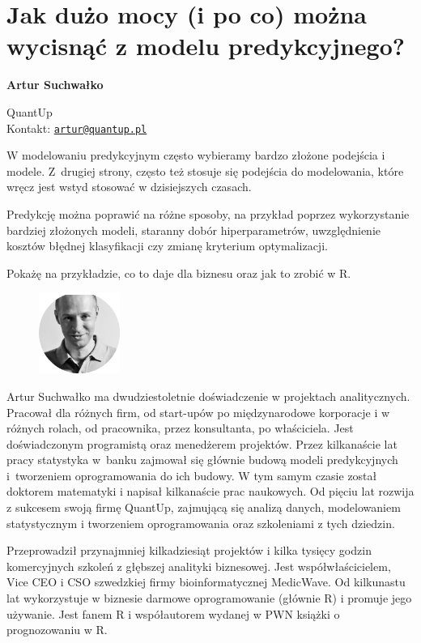 \documentclass[\main/boa.tex]{subfiles}
\begin{document}
\section{Jak dużo mocy (i po co) można wycisnąć z modelu predykcyjnego?}


\begin{minipage}{0.915\textwidth}
	\centering
  {\bf \LARGE {} Artur Suchwałko}
\end{minipage}


\begin{affiliations}
\begin{minipage}{0.915\textwidth}
\centering
\large QuantUp \\[1pt]
Kontakt: \href{mailto:artur@quantup.pl}{\nolinkurl{artur@quantup.pl}}\\
\end{minipage}
\end{affiliations}


W modelowaniu predykcyjnym często wybieramy bardzo złożone podejścia i modele. Z~drugiej strony, często też stosuje się podejścia do modelowania, które wręcz jest wstyd stosować w dzisiejszych czasach.

Predykcję można poprawić na różne sposoby, na przykład poprzez wykorzystanie bardziej złożonych modeli, staranny dobór hiperparametrów, uwzględnienie kosztów błędnej klasyfikacji czy zmianę kryterium optymalizacji.

Pokażę na przykładzie, co to daje dla biznesu oraz jak to zrobić w R.

\bio
\begin{figure}
    \includegraphics[width=100px]{img/guests/czarno_biale/artur.png}
\end{figure} 
Artur Suchwałko ma dwudziestoletnie doświadczenie w projektach analitycznych. Pracował dla różnych firm, od start-upów po międzynarodowe korporacje i w różnych rolach, od pracownika, przez konsultanta, po właściciela. Jest doświadczonym programistą oraz menedżerem projektów. Przez kilkanaście lat pracy statystyka w~banku zajmował się głównie budową modeli predykcyjnych i~tworzeniem oprogramowania do ich budowy. W tym samym czasie został doktorem matematyki i napisał kilkanaście prac naukowych. Od pięciu lat rozwija z sukcesem swoją firmę QuantUp, zajmującą się analizą danych, modelowaniem statystycznym i tworzeniem oprogramowania oraz szkoleniami z tych dziedzin.

Przeprowadził przynajmniej kilkadziesiąt projektów i kilka tysięcy godzin komercyjnych szkoleń z głębszej analityki biznesowej. Jest współwłaścicielem, Vice CEO i CSO szwedzkiej firmy bioinformatycznej MedicWave. Od kilkunastu lat wykorzystuje w biznesie darmowe \break oprogramowanie (głównie R) i promuje jego używanie. Jest fanem R i współautorem wydanej w PWN książki o prognozowaniu w R.
\end{document}
